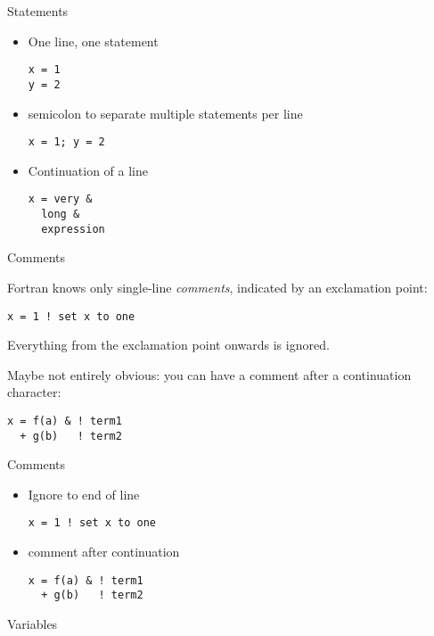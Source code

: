 \begin{slide}{Statements}
  \label{sl:fstatement}
  \begin{itemize}
  \item One line, one statement
\begin{verbatim}
x = 1
y = 2
\end{verbatim}
\item semicolon to separate multiple statements per line
\begin{verbatim}
x = 1; y = 2
\end{verbatim}
\item Continuation of a line
\begin{verbatim}
x = very &
  long &
  expression
\end{verbatim}
  \end{itemize}
\end{slide}

 {Comments}

Fortran knows only single-line
\emph{comments},
indicated by an exclamation point:
\begin{verbatim}
x = 1 ! set x to one
\end{verbatim}
Everything from the exclamation point onwards is ignored.

Maybe not entirely obvious: you can have a comment after a
continuation character:
\begin{verbatim}
x = f(a) & ! term1 
  + g(b)   ! term2
\end{verbatim}

\begin{slide}{Comments}
  \label{sl:fcomment}
  \begin{itemize}
  \item Ignore to end of line
\begin{verbatim}
x = 1 ! set x to one
\end{verbatim}
\item comment after continuation
\begin{verbatim}
x = f(a) & ! term1 
  + g(b)   ! term2
\end{verbatim}
  \end{itemize}
\end{slide}

 {Variables}

